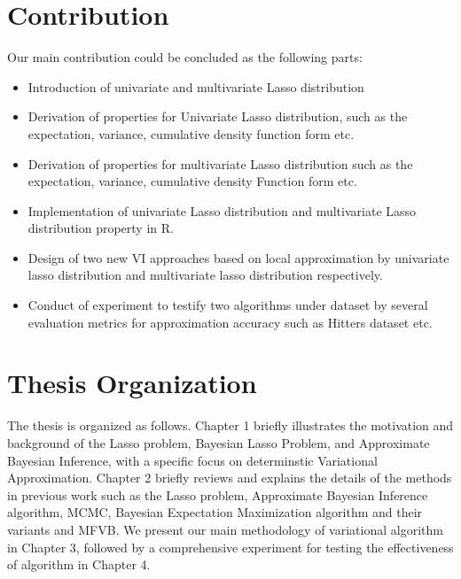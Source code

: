 \section{Contribution}
\label{cont}
Our main contribution could be concluded as the following parts:
\begin{itemize}
	\item Introduction of univariate and multivariate Lasso distribution
	\item Derivation of properties for Univariate Lasso distribution, such as the expectation, variance, cumulative density function form etc.
	\item Derivation of properties for multivariate Lasso distribution such as the expectation, variance, cumulative density Function form etc.
	\item Implementation of univariate Lasso distribution and multivariate Lasso distribution property in R.
	\item Design of two new VI approaches based on local approximation by univariate lasso distribution and multivariate lasso distribution respectively.
	\item Conduct of experiment to testify two algorithms under dataset by several evaluation metrics for approximation accuracy such as Hitters dataset etc.
\end{itemize}



\section{Thesis Organization}
The thesis is organized as follows. Chapter 1 briefly illustrates the motivation and background of the Lasso problem, Bayesian Lasso Problem, and Approximate Bayesian Inference, with a specific focus on determinstic  Variational Approximation. Chapter 2  briefly reviews and explains the details of the methods in previous work such as the Lasso problem, Approximate Bayesian Inference algorithm, MCMC, Bayesian Expectation Maximization algorithm and their variants and MFVB. We present our main methodology of variational algorithm in Chapter 3, followed by a comprehensive experiment for testing the effectiveness of algorithm in Chapter 4. 



 